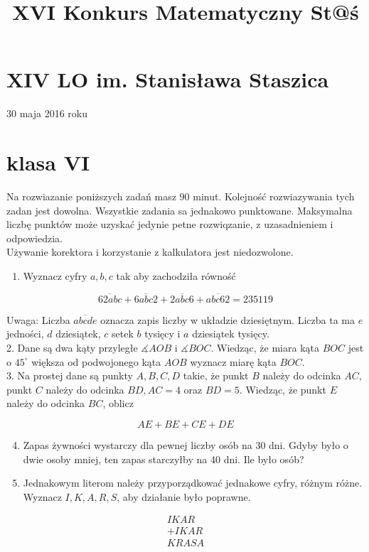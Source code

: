 \documentclass[10pt]{article}
\title{XVI Konkurs Matematyczny St@ś }
\author{}
\date{}
\begin{document}
\maketitle
\section*{XIV LO im. Stanisława Staszica}
30 maja 2016 roku

\section*{klasa VI}
Na rozwiazanie poniższych zadań masz 90 minut. Kolejność rozwiazywania tych zadan jest dowolna. Wszystkie zadania sa jednakowo punktowane. Maksymalna liczbę punktów może uzyskać jedynie petne rozwiqzanie, z uzasadnieniem i odpowiedzia.\\
Używanie korektora i korzystanie z kalkulatora jest niedozwolone.

\begin{enumerate}
  \item Wyznacz cyfry \(a, b, c\) tak aby zachodziła równość
\end{enumerate}

\[
\overline{62 a b c}+\overline{6 a b c 2}+\overline{2 a b c 6}+\overline{a b c 62}=235119
\]

Uwaga: Liczba \(\overline{a b c d e}\) oznacza zapis liczby w układzie dziesiętnym. Liczba ta ma \(e\) jedności, \(d\) dziesiątek, \(c\) setek \(b\) tysięcy i \(a\) dziesiątek tysięcy.\\
2. Dane są dwa kąty przyległe \(\measuredangle A O B\) i \(\measuredangle B O C\). Wiedząc, że miara kąta \(B O C\) jest o \(45^{\circ}\) większa od podwojonego kąta \(A O B\) wyznacz miarę kąta \(B O C\).\\
3. Na prostej dane są punkty \(A, B, C, D\) takie, że punkt \(B\) należy do odcinka \(A C\), punkt \(C\) należy do odcinka \(B D, A C=4\) oraz \(B D=5\). Wiedząc, że punkt \(E\) należy do odcinka \(B C\), oblicz

\[
A E+B E+C E+D E
\]

\begin{enumerate}
  \setcounter{enumi}{3}
  \item Zapas żywności wystarczy dla pewnej liczby osób na 30 dni. Gdyby było o dwie osoby mniej, ten zapas starczyłby na 40 dni. Ile było osób?
  \item Jednakowym literom należy przyporządkować jednakowe cyfry, różnym różne. Wyznacz \(I, K, A, R, S\), aby działanie było poprawne.
\end{enumerate}

\[
\begin{array}{r}
I K A R \\
+I K A R \\
\hline K R A S A
\end{array}
\]
\end{document}
